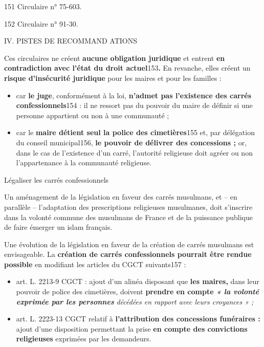 151 Circulaire n° 75-603.

152 Circulaire n° 91-30.

IV. PISTES DE RECOMMAND ATIONS

Ces circulaires ne créent \textbf{aucune obligation juridique} et
entrent \textbf{en contradiction avec l'état du droit
actuel}153\textbf{.} En revanche, elles créent un \textbf{risque
d'insécurité juridique} pour les maires et pour les familles :


\begin{itemize}
\item
  car \textbf{le juge}, conformément à la loi, \textbf{n'admet pas
  l'existence des carrés confessionnels}154 : il ne ressort pas du
  pouvoir du maire de définir si une personne appartient ou non à une
  communauté ;
\item
  car le \textbf{maire détient seul la police des cimetières}155 et, par
  délégation du conseil municipal156, \textbf{le pouvoir de délivrer des
  concessions ;} or, dans le cas de l'existence d'un carré, l'autorité
  religieuse doit agréer ou non l'appartenance à la communauté
  religieuse.
\end{itemize}

Légaliser les carrés confessionnels

Un aménagement de la législation en faveur des carrés musulmans, et --
en parallèle -- l'adaptation des prescriptions religieuses musulmanes,
doit s'inscrire dans la volonté commune des musulmans de France et de la
puissance publique de faire émerger un islam français.


Une évolution de la législation en faveur de la création de carrés
musulmans est envisageable. La \textbf{création de carrés confessionnels
pourrait être rendue possible} en modifiant les articles du CGCT
suivants157 :


\begin{itemize}
\item
  art. L. 2213-9 CGCT : ajout d'un alinéa disposant que \textbf{les
  maires,} dans leur pouvoir de police des cimetières, doivent
  \textbf{prendre en compte \emph{« la volonté exprimée par les
  personnes }}\emph{décédées en rapport avec leurs croyances » ;}
\item
  art. L. 2223-13 CGCT relatif à \textbf{l'attribution des concessions
  funéraires :} ajout d'une disposition permettant la prise \textbf{en
  compte des convictions religieuses} exprimées par les demandeurs.
\end{itemize}


